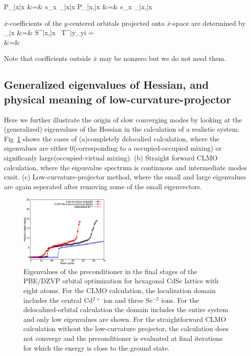 \documentclass[aps,prl,twocolumn,reprint,amsmath,amssymb]{revtex4-1}
\begin{document}
%
\small {
\bea
P_{\bar{x}\bar{x}} &=& s_x _{\bar{x}\bar{x}} 
\eea 
%
\bea
P_{\bar{x}\mu,\bar{x}\nu} &=& s_x _{\bar{x}\mu,\bar{x}\nu} 
\eea 

$\bar{x}$-coefficients of the $y$-centered orbitals projected onto $\bar{x}$-space are determined by
%
\bea
{}_{\bar{x}}   &=&  S^{\bar{x}\mu,\bar{x}\nu} \, {T^{\bar{y}\lambda}}_{yi} = \nonumber \\
 &=&  
\eea 
}
%
Note that coefficients outside $\bar{x}$ may be nonzero but we do not need them.

\subsection{Generalized eigenvalues of Hessian, and physical meaning of low-curvature-projector}

Here we further illustrate the origin of slow converging modes by looking at the (generalized) eigenvalues of the Hessian in the calculation of a realistic system. Fig~\ref{sfig:hesseig} shows the cases of (a)completely delocalied calculation, where the eigenvalues are either 0(corresponding to a occupied-occupied mixing) or significanly large(occupied-virtual mixing). (b) Straight forward CLMO calculation, where the eigenvalue spectrum is continuous and intermediate modes exsit. (c) Low-curvature-projector method, where the small and large eigenvalues are again seperated after removing some of the small eigenvectors.

\begin{figure}
\centering
\includegraphics[width=0.4\textwidth]{Hesseig}
\caption{Eigenvalues of the preconditioner in the final stages of the PBE/DZVP orbital optimization for hexagonal CdSe lattice with eight atoms. For the CLMO calculation, the localization domain includes the central Cd$^{2+}$ ion and three Se$^{-2}$ ions. For the delocalized-orbital calculation the domain includes the entire system and only low eigenvalues are shown. For the straightforward CLMO calculation without the low-curvature projector, the calculation does not converge and the preconditioner is evaluated at final iterations for which the energy is close to the ground state.}
\label{sfig:hesseig}
\end{figure}
\end{document}
